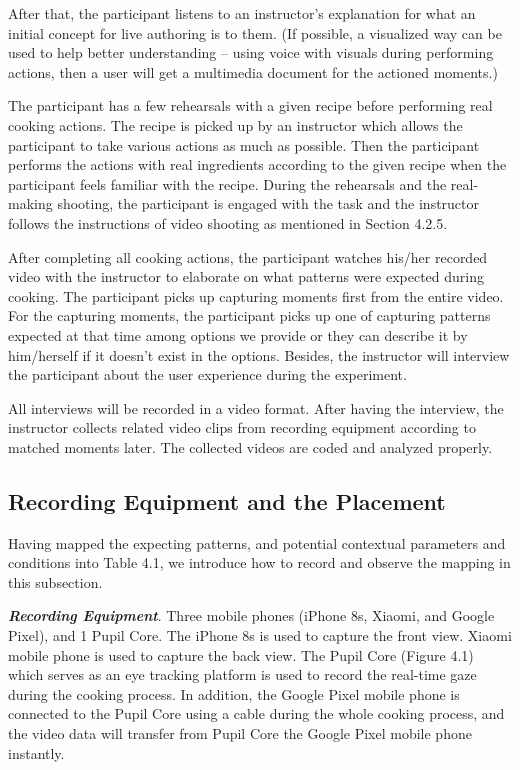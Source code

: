 \documentclass[fyp]{socreport}
\begin{document}
After that, the participant listens to an instructor’s explanation for what an initial concept for live authoring is to them. (If possible, a visualized way can be used to help better understanding -- using voice with visuals during performing actions, then a user will get a multimedia document for the actioned moments.) 

The participant has a few rehearsals with a given recipe before performing real cooking actions. The recipe is picked up by an instructor which allows the participant to take various actions as much as possible. Then the participant performs the actions with real ingredients according to the given recipe when the participant feels familiar with the recipe. During the rehearsals and the real-making shooting, the participant is engaged with the task and the instructor follows the instructions of video shooting as mentioned in Section 4.2.5. 

After completing all cooking actions, the participant watches his/her recorded video with the instructor to elaborate on what patterns were expected during cooking. The participant picks up capturing moments first from the entire video. For the capturing moments, the participant picks up one of capturing patterns expected at that time among options we provide or they can describe it by him/herself if it doesn't exist in the options. Besides, the instructor will interview the participant about the user experience during the experiment.

All interviews will be recorded in a video format. After having the interview, the instructor collects related video clips from recording equipment according to matched moments later. The collected videos are coded and analyzed properly.

\subsection{Recording Equipment and the Placement}
Having mapped the expecting patterns, and potential contextual parameters and conditions into Table 4.1, we introduce how to record and observe the mapping in this subsection.

\textbf{\textit{Recording Equipment}}. Three mobile phones (iPhone 8s, Xiaomi, and Google Pixel), and 1 Pupil Core. The iPhone 8s is used to capture the front view. Xiaomi mobile phone is used to capture the back view. The Pupil Core (Figure 4.1) which serves as an eye tracking platform is used to record the real-time gaze during the cooking process. In addition, the Google Pixel mobile phone is connected to the Pupil Core using a cable during the whole cooking process, and the video data will transfer from Pupil Core the Google Pixel mobile phone instantly. 
\end{document}
